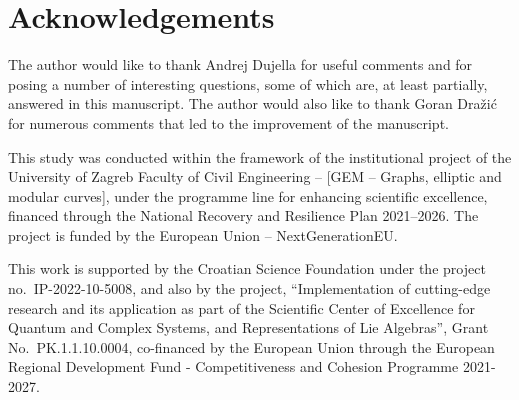 \documentclass{article}
\theoremstyle{plain}
\begin{document}
\section*{Acknowledgements}
The author would like to thank Andrej Dujella for useful comments and for posing a number of interesting questions, some of which are, at least partially, answered in this manuscript. The author would also like to thank Goran Dražić for numerous comments that led to the improvement of the manuscript.

This study was conducted within the framework of the institutional project of the University of Zagreb Faculty of Civil Engineering – [GEM
– Graphs, elliptic and modular curves], under the programme line for enhancing scientific excellence, financed through
the National Recovery and Resilience Plan 2021–2026. The project is funded by the European Union – NextGenerationEU.

This work is supported by the Croatian Science Foundation under the project no.~IP-2022-10-5008, and also by the project, ``Implementation of cutting-edge research and its application as part of the Scientific Center of Excellence for Quantum and Complex Systems, and Representations of Lie Algebras'', Grant No.~PK.1.1.10.0004, co-financed by the European Union through the European Regional Development Fund - Competitiveness and Cohesion Programme 2021-2027.

\printbibliography
\end{document}
